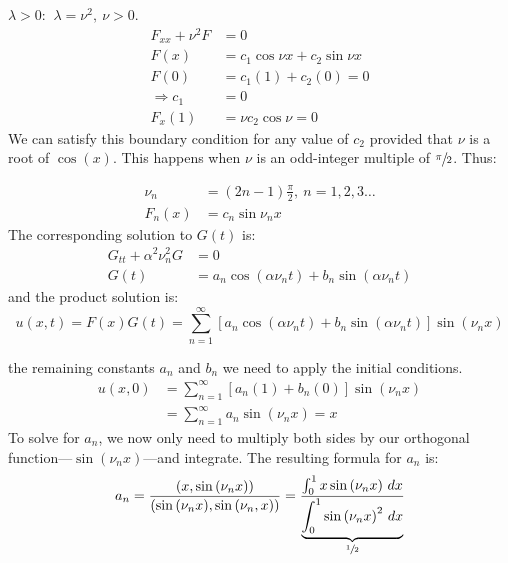 \vspace{0.25cm}

\noindent\underline{$\lambda > 0$}: $\ \lambda = \nu^2, \ \nu>0$.
\begin{align*}
F_{xx} + \nu^2 F &= 0 \\
F(x) &= c_1\cos{\nu x} + c_2 \sin{\nu x} \\
F(0) &= c_1(1) + c_2(0) = 0 \\
\Rightarrow c_1 &= 0 \\
F_{x}(1) &= \nu c_2 \cos{\nu} = 0
\end{align*}
We can satisfy this boundary condition for any value of $c_2$ provided that $\nu$ is a root of $\cos(x)$.  This happens when $\nu$ is an odd-integer multiple of $\sfrac{\pi}{2}$.  Thus:

\begin{align*}
\nu_n &= (2n-1)\frac{\pi}{2}, \ n=1,2,3\dots \\
F_n(x) &= c_n \sin{\nu_n x}
\end{align*} 
The corresponding solution to $G(t)$ is:
\begin{align*}
G_{tt} + \alpha^2 \nu_n^2 G &= 0 \\
G(t) &= a_n \cos{(\alpha \nu_n t)}+b_n\sin{(\alpha \nu_n t)}
\end{align*}
and the product solution is:
\begin{equation*}
u(x,t) = F(x)G(t) = \sum\limits_{n=1}^{\infty} \left[a_n \cos{(\alpha \nu_n t)}+b_n\sin{(\alpha \nu_n t)} \right]\sin{(\nu_n x)}
\end{equation*}

 the remaining constants $a_n$ and $b_n$ we need to apply the initial conditions.
\begin{align*}
u(x,0) &= \sum\limits_{n=1}^{\infty}\left[a_n(1) + b_n(0) \right]\sin{(\nu_n x)} \\
&=\sum\limits_{n=1}^{\infty} a_n \sin{(\nu_n x)} = x
\end{align*}
To solve for $a_n$, we now only need to multiply both sides by our orthogonal function---$\sin{(\nu_n x)}$---and integrate.  The resulting formula for $a_n$ is:
\begin{equation*}
a_n = \frac{(x,\sin{(\nu_n x)})}{(\sin{(\nu_nx)},\sin{(\nu_n,x)})} = \frac{\int_{0}^{1}x \sin{(\nu_n x)} \ dx}{\underbrace{\int_0^1 \sin{(\nu_n x)}^2 \ dx}_{\sfrac{1}{2}}}
\end{equation*}

